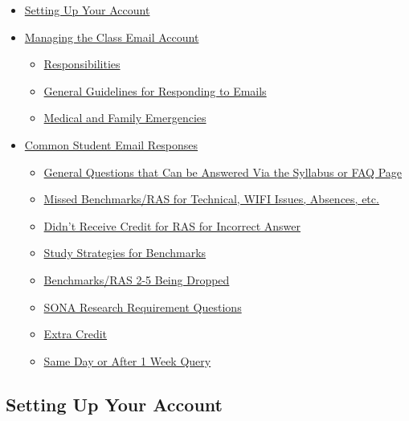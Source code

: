 \documentclass[
]{article}
\providecommand{\tightlist}{%
  \setlength{\itemsep}{0pt}\setlength{\parskip}{0pt}}
\begin{document}
\begin{itemize}
\tightlist
\item
  \protect\hyperlink{setting-up-your-account}{Setting Up Your Account}
\item
  \protect\hyperlink{managing-the-class-email-account}{Managing the Class Email Account}

  \begin{itemize}
  \tightlist
  \item
    \protect\hyperlink{responsibilities}{Responsibilities}
  \item
    \protect\hyperlink{general-guidelines-for-responding-to-emails}{General Guidelines for Responding to Emails}
  \item
    \protect\hyperlink{medical-and-family-emergencies}{Medical and Family Emergencies}
  \end{itemize}
\item
  \protect\hyperlink{common-student-email-responses}{Common Student Email Responses}

  \begin{itemize}
  \tightlist
  \item
    \protect\hyperlink{general-questions}{General Questions that Can be Answered Via the Syllabus or FAQ Page}
  \item
    \protect\hyperlink{missed-benchmarks}{Missed Benchmarks/RAS for Technical, WIFI Issues, Absences, etc.}
  \item
    \protect\hyperlink{didnt-receive-credit}{Didn't Receive Credit for RAS for Incorrect Answer}
  \item
    \protect\hyperlink{study-strategies}{Study Strategies for Benchmarks}
  \item
    \protect\hyperlink{benchmarks-ras-dropped}{Benchmarks/RAS 2-5 Being Dropped}
  \item
    \protect\hyperlink{sona-research}{SONA Research Requirement Questions}
  \item
    \protect\hyperlink{extra-credit}{Extra Credit}
  \item
    \protect\hyperlink{same-day-query}{Same Day or After 1 Week Query}
  \end{itemize}
\end{itemize}

\hypertarget{setting-up-your-account}{%
\subsection{Setting Up Your Account}\label{setting-up-your-account}}
\end{document}

